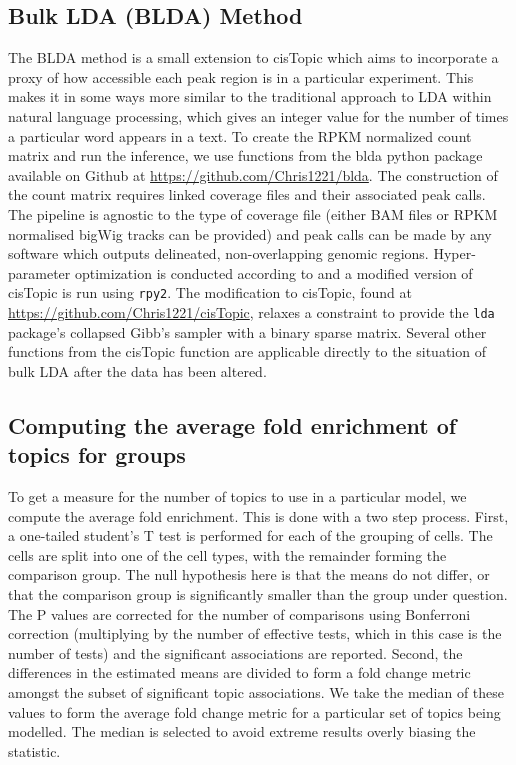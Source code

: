 \subsection{Bulk LDA (BLDA) Method}

The BLDA method is a small extension to cisTopic which aims to incorporate a proxy of how accessible each peak region is in a particular experiment. This makes it in some ways more similar to the traditional approach to LDA within natural language processing, which gives an integer value for the number of times a particular word appears in a text. To create the RPKM normalized count matrix and run the inference, we use functions from the blda python package available on Github at \url{https://github.com/Chris1221/blda}.  The construction of the count matrix requires linked coverage files and their associated peak calls. The pipeline is agnostic to the type of coverage file (either BAM files or RPKM normalised bigWig tracks can be provided) and peak calls can be made by any software which outputs delineated, non-overlapping genomic regions. Hyper-parameter optimization is conducted according to  and a modified version of cisTopic is run using {\tt rpy2}. The modification to cisTopic, found at \url{https://github.com/Chris1221/cisTopic}, relaxes a constraint to provide the {\tt lda} package's collapsed Gibb's sampler with a binary sparse matrix. Several other functions from the cisTopic function are applicable directly to the situation of bulk LDA after the data has been altered. 

\subsection{Computing the average fold enrichment of topics for groups} \label{methods:average_fc}

To get a measure for the number of topics to use in a particular model, we compute the average fold enrichment. This is done with a two step process. First, a one-tailed student's T test is performed for each of the grouping of cells. The cells are split into one of the cell types, with the remainder forming the comparison group. The null hypothesis here is that the means do not differ, or that the comparison group is significantly smaller than the group under question. The P values are corrected for the number of comparisons using Bonferroni correction (multiplying by the number of effective tests, which in this case is the number of tests) and the significant associations are reported. Second, the differences in the estimated means are divided to form a fold change metric amongst the subset of significant topic associations. We take the median of these values to form the average fold change metric for a particular set of topics being modelled. The median is selected to avoid extreme results overly biasing the statistic.

